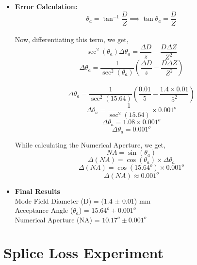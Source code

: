 \begin{itemize}

    \item \textbf{Error Calculation: }
    $$ \theta_{a} = \tan^{-1}\frac{D}{Z} \implies \tan\theta_{a} = \frac{D}{Z} $$ \\
    Now, differentiating this term, we get,
    $$ \sec^{2}(\theta_{a})  \Delta \theta_{a} = \frac{\Delta D}{z} - \frac{D \Delta Z}{Z^{2}} $$
    $$ \Delta \theta_{a} = \frac{1}{\sec^{2}(\theta_{a})}\left(\frac{\Delta D}{z} - \frac{D \Delta Z}{Z^{2}}\right) $$ \\
    $$ \Delta \theta_{a} = \frac{1}{\sec^{2}(15.64)}\left(\frac{0.01}{5} - \frac{1.4 \times 0.01}{5^{2}}\right) $$
    $$  \Delta \theta_{a} = \frac{1}{\sec^{2}(15.64)} \times 0.001^{o} $$
    $$ \Delta \theta_{a} = 1.08 \times 0.001^{o} $$
    $$ \Delta \theta_{a} = 0.001^{o} $$
    
    While calculating the Numerical Aperture, we get,
    $$ NA = \sin{(\theta_{a})}$$
    $$ \Delta(NA) = \cos{(\theta_{a}) \times \Delta\theta_{a}}$$
    $$ \Delta(NA) = \cos{(15.64^{o}) \times 0.001^{o}} $$
    $$ \Delta(NA) \approx 0.001^{o}$$
    
    \item \textbf{Final Results} \\
    Mode Field Diameter (D) = (1.4 $\pm$ 0.01) mm \\
    Acceptance Angle ($\theta_{a}$) = $15.64^{o} \pm 0.001^{o}$ \\
    Numerical Aperture (NA) = $10.17^{o} \pm 0.001^{o}$ \\

\end{itemize}

\section{Splice Loss Experiment}


